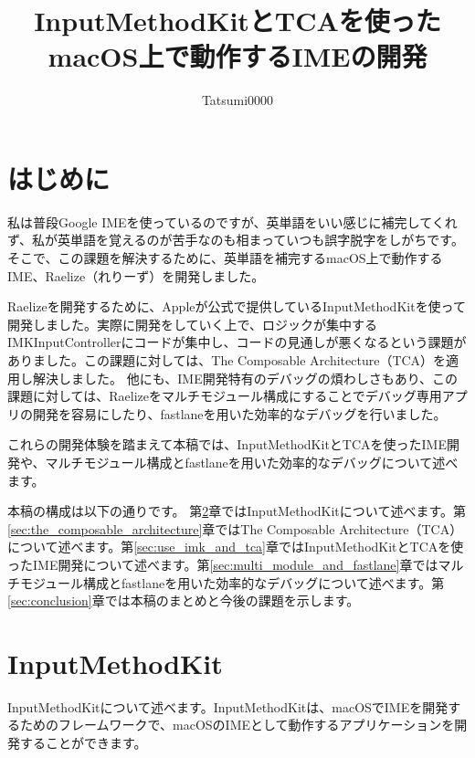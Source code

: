 \documentclass[uplatex,a4j,12pt,twocolumn]{jsarticle}
\begin{document}
\title{\vspace{-10mm}InputMethodKitとTCAを使ったmacOS上で動作するIMEの開発}
\author{Tatsumi0000}
\date{\vspace{-15mm}}
\maketitle

\section{はじめに}\label{sec:intro}
私は普段Google IMEを使っているのですが、英単語をいい感じに補完してくれず、私が英単語を覚えるのが苦手なのも相まっていつも誤字脱字をしがちです。そこで、この課題を解決するために、英単語を補完するmacOS上で動作するIME、Raelize（れりーず）を開発しました。

Raelizeを開発するために、Appleが公式で提供しているInputMethodKit\cite{bib:about_inputmethodkit}を使って開発しました。実際に開発をしていく上で、ロジックが集中するIMKInputControllerにコードが集中し、コードの見通しが悪くなるという課題がありました。この課題に対しては、The Composable Architecture（TCA）\cite{bib:the_composable_architecture}を適用し解決しました。
他にも、IME開発特有のデバッグの煩わしさもあり、この課題に対しては、Raelizeをマルチモジュール構成にすることでデバッグ専用アプリの開発を容易にしたり、fastlane\cite{bib:fastlane}を用いた効率的なデバッグを行いました。

これらの開発体験を踏まえて本稿では、InputMethodKitとTCAを使ったIME開発や、マルチモジュール構成とfastlaneを用いた効率的なデバッグについて述べます。

本稿の構成は以下の通りです。
第\ref{sec:abount_inputmethodkit}章ではInputMethodKitについて述べます。第\ref{sec:the_composable_architecture}章ではThe Composable Architecture（TCA）について述べます。第\ref{sec:use_imk_and_tca}章ではInputMethodKitとTCAを使ったIME開発について述べます。第\ref{sec:multi_module_and_fastlane}章ではマルチモジュール構成とfastlaneを用いた効率的なデバッグについて述べます。第\ref{sec:conclusion}章では本稿のまとめと今後の課題を示します。

\section{InputMethodKit}\label{sec:abount_inputmethodkit}
InputMethodKitについて述べます。InputMethodKitは、macOSでIMEを開発するためのフレームワークで、macOSのIMEとして動作するアプリケーションを開発することができます。
\end{document}
